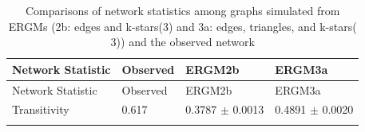 \documentclass[12pt,twoside]{amherstthesis}
\begin{document}
  \begin{longtable}[]{@{}llll@{}}
  \caption{Comparisons of network statistics among graphs simulated from
  ERGMs (2b: edges and k-stars(3) and 3a: edges, triangles, and
  k-stars(\(3\))) and the observed network
  \label{tab:ergm2b3a}}\tabularnewline
  \toprule
  \begin{minipage}[b]{0.28\columnwidth}\raggedright\strut
  Network Statistic\strut
  \end{minipage} & \begin{minipage}[b]{0.11\columnwidth}\raggedright\strut
  Observed\strut
  \end{minipage} & \begin{minipage}[b]{0.24\columnwidth}\raggedright\strut
  ERGM2b\strut
  \end{minipage} & \begin{minipage}[b]{0.26\columnwidth}\raggedright\strut
  ERGM3a\strut
  \end{minipage}\tabularnewline
  \midrule
  \endfirsthead
  \toprule
  \begin{minipage}[b]{0.28\columnwidth}\raggedright\strut
  Network Statistic\strut
  \end{minipage} & \begin{minipage}[b]{0.11\columnwidth}\raggedright\strut
  Observed\strut
  \end{minipage} & \begin{minipage}[b]{0.24\columnwidth}\raggedright\strut
  ERGM2b\strut
  \end{minipage} & \begin{minipage}[b]{0.26\columnwidth}\raggedright\strut
  ERGM3a\strut
  \end{minipage}\tabularnewline
  \midrule
  \endhead
  \begin{minipage}[t]{0.28\columnwidth}\raggedright\strut
  Transitivity\strut
  \end{minipage} & \begin{minipage}[t]{0.11\columnwidth}\raggedright\strut
  0.617\strut
  \end{minipage} & \begin{minipage}[t]{0.24\columnwidth}\raggedright\strut
  0.3787 \(\pm\) 0.0013\strut
  \end{minipage} & \begin{minipage}[t]{0.26\columnwidth}\raggedright\strut
  0.4891 \(\pm\) 0.0020\strut
  \end{minipage}\tabularnewline
  \begin{minipage}[t]{0.28\columnwidth}\raggedright\strut

\end{minipage}
\end{longtable}
\end{document}
